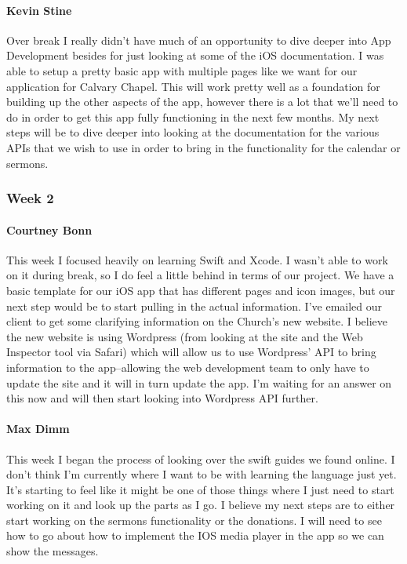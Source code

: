 			\paragraph{Kevin Stine}
			Over break I really didn't have much of an opportunity to dive deeper into App Development besides for just looking at some of the iOS documentation. I was able to setup a pretty basic app with multiple pages like we want for our application for Calvary Chapel. This will work pretty well as a foundation for building up the other aspects of the app, however there is a lot that we'll need to do in order to get this app fully functioning in the next few months. My next steps will be to dive deeper into looking at the documentation for the various APIs that we wish to use in order to bring in the functionality for the calendar or sermons.
			
		\subsubsection{Week 2}
		
			\paragraph{Courtney Bonn}
			This week I focused heavily on learning Swift and Xcode. I wasn't able to work on it during break, so I do feel a little behind in terms of our project. We have a basic template for our iOS app that has different pages and icon images, but our next step would be to start pulling in the actual information. I've emailed our client to get some clarifying information on the Church's new website. I believe the new website is using Wordpress (from looking at the site and the Web Inspector tool via Safari) which will allow us to use Wordpress' API to bring information to the app--allowing the web development team to only have to update the site and it will in turn update the app. I'm waiting for an answer on this now and will then start looking into Wordpress API further.

			\paragraph{Max Dimm}
			This week I began the process of looking over the swift guides we found online. I don't think I'm currently where I want to be with learning the language just yet. It's starting to feel like it might be one of those things where I just need to start working on it and look up the parts as I go. I believe my next steps are to either start working on the sermons functionality or the donations. I will need to see how to go about how to implement the IOS media player in the app so we can show the messages.
			
